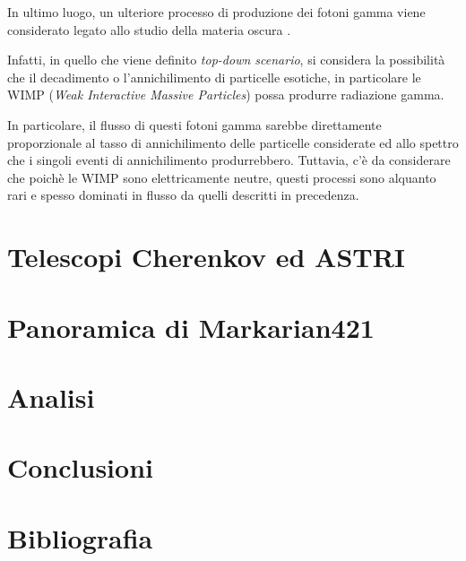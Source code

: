 \documentclass[10pt]{article}
\begin{document}
In ultimo luogo, un ulteriore processo di produzione dei fotoni gamma viene considerato legato allo studio della materia oscura \cite{GRA2018}.

Infatti, in quello che viene definito \textit{top-down scenario}, si considera la possibilità che il decadimento o l'annichilimento di particelle esotiche, in particolare le WIMP (\textit{Weak Interactive Massive Particles}) possa produrre radiazione gamma.

In particolare, il flusso di questi fotoni gamma sarebbe direttamente proporzionale al tasso di annichilimento delle particelle considerate ed allo spettro che i singoli eventi di annichilimento produrrebbero.
Tuttavia, c'è da considerare che poichè le WIMP sono elettricamente neutre, questi processi sono alquanto rari e spesso dominati in flusso da quelli descritti in precedenza.

\newpage

\section{Telescopi Cherenkov ed ASTRI}

\newpage

\section{Panoramica di Markarian421}

\newpage

\section{Analisi}

\newpage

\section{Conclusioni}

\newpage

\section{Bibliografia}
\printbibliography
\end{document}
